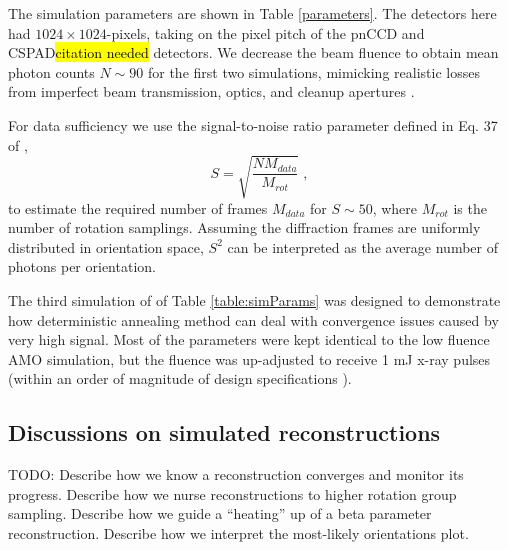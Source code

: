 \documentclass[]{iucr}              %
\begin{document}
The simulation parameters are shown in Table \ref{parameters}. The detectors here had $1024\times1024$-pixels, taking on the pixel pitch of the pnCCD\cite{Struder2010} and CSPAD\hl{citation needed} detectors. We decrease the beam fluence to obtain mean photon counts $N\sim 90$ for the first two simulations, mimicking realistic losses from imperfect beam transmission, optics, and cleanup apertures \cite{Loh2013}. 

For data sufficiency we use the signal-to-noise ratio parameter defined in Eq. 37 of , 
\begin{equation}
S = \sqrt{\frac{N M_{data}}{M_{rot}}}\; ,
\end{equation}
to estimate the required number of frames $M_{data}$ for $S\sim50$, where $M_{rot}$ is the number of rotation samplings. Assuming the diffraction frames are uniformly distributed in orientation space, $S^2$ can be interpreted as the average number of photons per orientation.

The third simulation of of Table \ref{table:simParams} was designed to demonstrate how deterministic annealing method can deal with convergence issues caused by very high signal. Most of the parameters were kept identical to the low fluence AMO simulation, but the fluence was up-adjusted to receive 1 mJ x-ray pulses (within an order of magnitude of design specifications \cite{Emma2010}).

\subsection{Discussions on simulated reconstructions} \label{subsec:recon}
TODO: Describe how we know a reconstruction converges and monitor its progress. Describe how we nurse reconstructions to higher rotation group sampling. Describe how we guide a ``heating'' up of a beta parameter reconstruction. Describe how we interpret the most-likely orientations plot.
\end{document}

